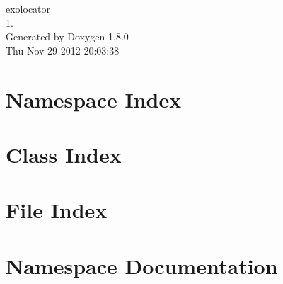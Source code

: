 \documentclass{book}
\begin{document}
\hypersetup{pageanchor=false,citecolor=blue}
\begin{titlepage}
\vspace*{7cm}
\begin{center}
{\Large exolocator \\[1ex]\large 1. }\\
\vspace*{1cm}
{\large Generated by Doxygen 1.8.0}\\
\vspace*{0.5cm}
{\small Thu Nov 29 2012 20:03:38}\\
\end{center}
\end{titlepage}
\clearemptydoublepage
{}
\tableofcontents
\clearemptydoublepage
{}
\hypersetup{pageanchor=true,citecolor=blue}
\chapter{Namespace Index}

\chapter{Class Index}

\chapter{File Index}

\chapter{Namespace Documentation}












































\end{document}
